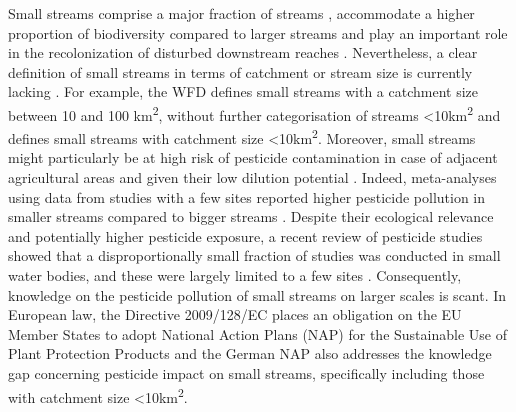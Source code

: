 \documentclass[journal=esthag,manuscript=article]{achemso}
\begin{document}
Small streams comprise a major fraction of streams \citep{nadeau_hydrological_2007}, accommodate a higher proportion of biodiversity compared to larger streams \citep{davies_comparison_2008, biggs_report_2014} and play an important role in the recolonization of disturbed downstream reaches \citep{liess_analyzing_2005, orlinskiy_forested_2015}.
Nevertheless, a clear definition of small streams in terms of catchment or stream size is currently lacking \citep{lorenz_specifics_2016}. 
For example, the WFD defines small streams with a catchment size between 10 and 100 km\textsuperscript{2}, without further categorisation of streams \textless 10km\textsuperscript{2} and \citet{lorenz_specifics_2016} defines small streams with catchment size \textless 10km\textsuperscript{2}. 
Moreover, small streams might particularly be at high risk of pesticide contamination in case of adjacent agricultural areas and given their low dilution potential \citep{schulz_field_2004,liess_determination_1999}.
Indeed, meta-analyses using data from studies with a few sites reported higher pesticide pollution in smaller streams compared to bigger streams \citep{stehle_pesticide_2015,schulz_field_2004}. 
Despite their ecological relevance and potentially higher pesticide exposure, a recent review of pesticide studies showed that a disproportionally small fraction of studies was conducted in small water bodies, and these were largely limited to a few sites \citep{lorenz_specifics_2016}. 
Consequently, knowledge on the pesticide pollution of small streams on larger scales is scant. 
In European law, the Directive 2009/128/EC \citep{European_Union_2009} places an obligation on the EU Member States to adopt National Action Plans (NAP) for the Sustainable Use of Plant Protection Products and the German NAP also addresses the knowledge gap concerning pesticide impact on small streams, specifically including those with catchment size \textless 10km\textsuperscript{2}.
\end{document}

